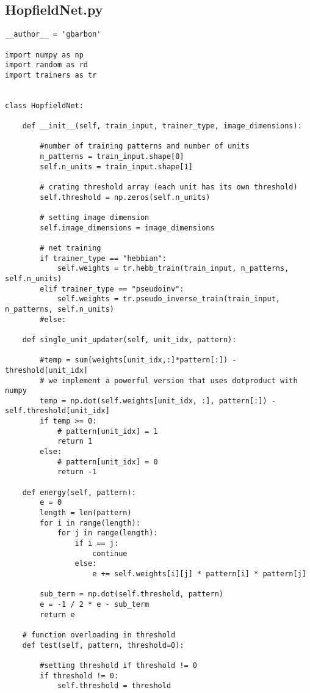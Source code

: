 \documentclass[letterpaper,twocolumn,10pt]{article}
\begin{document}
\subsection{HopfieldNet.py}
\begin{lstlisting}
__author__ = 'gbarbon'

import numpy as np
import random as rd
import trainers as tr


class HopfieldNet:

    def __init__(self, train_input, trainer_type, image_dimensions):

        #number of training patterns and number of units
        n_patterns = train_input.shape[0]
        self.n_units = train_input.shape[1]

        # crating threshold array (each unit has its own threshold)
        self.threshold = np.zeros(self.n_units)

        # setting image dimension
        self.image_dimensions = image_dimensions

        # net training
        if trainer_type == "hebbian":
            self.weights = tr.hebb_train(train_input, n_patterns, self.n_units)
        elif trainer_type == "pseudoinv":
            self.weights = tr.pseudo_inverse_train(train_input, n_patterns, self.n_units)
        #else:

    def single_unit_updater(self, unit_idx, pattern):

        #temp = sum(weights[unit_idx,:]*pattern[:]) - threshold[unit_idx]
        # we implement a powerful version that uses dotproduct with numpy
        temp = np.dot(self.weights[unit_idx, :], pattern[:]) - self.threshold[unit_idx]
        if temp >= 0:
            # pattern[unit_idx] = 1
            return 1
        else:
            # pattern[unit_idx] = 0
            return -1

    def energy(self, pattern):
        e = 0
        length = len(pattern)
        for i in range(length):
            for j in range(length):
                if i == j:
                    continue
                else:
                    e += self.weights[i][j] * pattern[i] * pattern[j]

        sub_term = np.dot(self.threshold, pattern)
        e = -1 / 2 * e - sub_term
        return e

    # function overloading in threshold
    def test(self, pattern, threshold=0):

        #setting threshold if threshold != 0
        if threshold != 0:
            self.threshold = threshold


\end{lstlisting}
\end{document}
